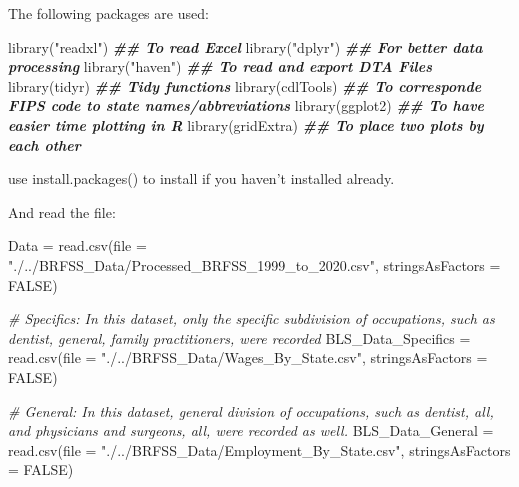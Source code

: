 \documentclass[
]{article}
\newenvironment{Shaded}{\begin{snugshade}}{\end{snugshade}}
\newcommand{\AttributeTok}[1]{\textcolor[rgb]{0.77,0.63,0.00}{#1}}
\newcommand{\CommentTok}[1]{\textcolor[rgb]{0.56,0.35,0.01}{\textit{#1}}}
\newcommand{\ConstantTok}[1]{\textcolor[rgb]{0.00,0.00,0.00}{#1}}
\newcommand{\DocumentationTok}[1]{\textcolor[rgb]{0.56,0.35,0.01}{\textbf{\textit{#1}}}}
\newcommand{\FunctionTok}[1]{\textcolor[rgb]{0.00,0.00,0.00}{#1}}
\newcommand{\NormalTok}[1]{#1}
\newcommand{\OtherTok}[1]{\textcolor[rgb]{0.56,0.35,0.01}{#1}}
\newcommand{\StringTok}[1]{\textcolor[rgb]{0.31,0.60,0.02}{#1}}
\begin{document}
The following packages are used:

\begin{Shaded}
\begin{Highlighting}[]
\FunctionTok{library}\NormalTok{(}\StringTok{"readxl"}\NormalTok{) }\DocumentationTok{\#\# To read Excel}
\FunctionTok{library}\NormalTok{(}\StringTok{"dplyr"}\NormalTok{) }\DocumentationTok{\#\# For better data processing}
\FunctionTok{library}\NormalTok{(}\StringTok{"haven"}\NormalTok{) }\DocumentationTok{\#\# To read and export DTA Files}
\FunctionTok{library}\NormalTok{(tidyr) }\DocumentationTok{\#\# Tidy functions}
\FunctionTok{library}\NormalTok{(cdlTools) }\DocumentationTok{\#\# To corresponde FIPS code to state names/abbreviations}
\FunctionTok{library}\NormalTok{(ggplot2) }\DocumentationTok{\#\# To have easier time plotting in R}
\FunctionTok{library}\NormalTok{(gridExtra) }\DocumentationTok{\#\# To place two plots by each other}
\end{Highlighting}
\end{Shaded}

use install.packages() to install if you haven't installed already.

And read the file:

\begin{Shaded}
\begin{Highlighting}[]
\NormalTok{Data }\OtherTok{=} \FunctionTok{read.csv}\NormalTok{(}\AttributeTok{file =} \StringTok{"./../BRFSS\_Data/Processed\_BRFSS\_1999\_to\_2020.csv"}\NormalTok{, }
                \AttributeTok{stringsAsFactors =} \ConstantTok{FALSE}\NormalTok{)}

\CommentTok{\# Specifics: In this dataset, only the specific subdivision of occupations, such as dentist, general, family practitioners, were recorded}
\NormalTok{BLS\_Data\_Specifics }\OtherTok{=} \FunctionTok{read.csv}\NormalTok{(}\AttributeTok{file =} \StringTok{"./../BRFSS\_Data/Wages\_By\_State.csv"}\NormalTok{, }
                              \AttributeTok{stringsAsFactors =} \ConstantTok{FALSE}\NormalTok{)}

\CommentTok{\# General: In this dataset, general division of occupations, such as dentist, all, and physicians and surgeons, all, were recorded as well.}
\NormalTok{BLS\_Data\_General }\OtherTok{=} \FunctionTok{read.csv}\NormalTok{(}\AttributeTok{file =} \StringTok{"./../BRFSS\_Data/Employment\_By\_State.csv"}\NormalTok{, }
                            \AttributeTok{stringsAsFactors =} \ConstantTok{FALSE}\NormalTok{)}
\end{Highlighting}
\end{Shaded}
\end{document}
